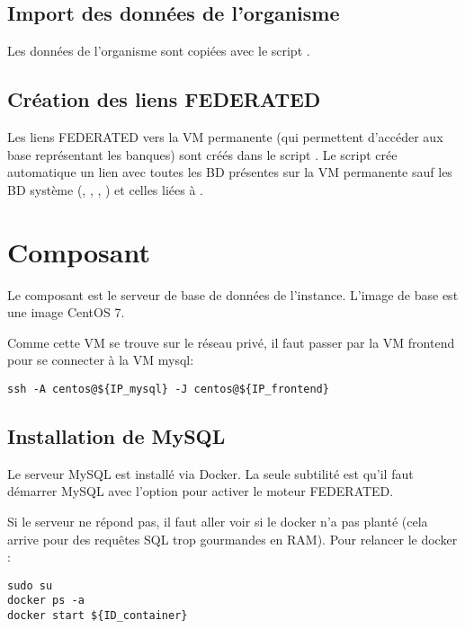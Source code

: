 \subsection{Import des données de l'organisme \theOrg{}}

Les données de l'organisme \theOid{} sont copiées avec le script .

\subsection{Création des liens FEDERATED}

Les liens FEDERATED vers la VM permanente (qui permettent d'accéder aux base représentant les banques) sont créés
dans le script .
Le script crée automatique un lien avec toutes les BD présentes sur la VM permanente sauf les BD système (, , , )
et celles liées à .

\section{Composant }\label{mysql}

Le composant  est le serveur de base de données de l'instance.
L'image de base est une image CentOS 7.

Comme cette VM se trouve sur le réseau privé, il faut passer par la VM frontend pour se connecter à la VM mysql:
\begin{lstlisting}[style=bash]
ssh -A centos@${IP_mysql} -J centos@${IP_frontend}
\end{lstlisting}

\subsection{Installation de MySQL}

Le serveur MySQL est installé via Docker.
La seule subtilité est qu'il faut démarrer MySQL avec l'option  pour activer le moteur FEDERATED.

Si le serveur ne répond pas, il faut aller voir si le docker n'a pas planté (cela arrive pour des requêtes SQL trop gourmandes en RAM).
Pour relancer le docker :
\begin{lstlisting}[style=bash]
sudo su
docker ps -a
docker start ${ID_container}
\end{lstlisting}

